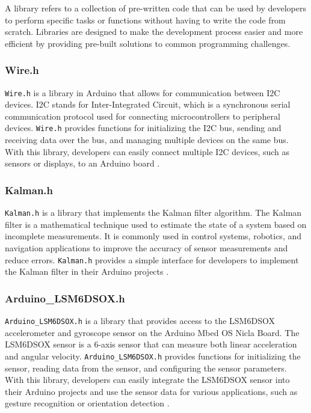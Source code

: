 A library refers to a collection of pre-written code that can be used by developers to perform specific tasks or functions without having to write the code from scratch. Libraries are designed to make the development process easier and more efficient by providing pre-built solutions to common programming challenges.

\subsubsection{Wire.h}
\texttt{Wire.h} is a library in Arduino that allows for communication between I2C devices. I2C stands for Inter-Integrated Circuit, which is a synchronous serial communication protocol used for connecting microcontrollers to peripheral devices. \texttt{Wire.h} provides functions for initializing the I2C bus, sending and receiving data over the bus, and managing multiple devices on the same bus. With this library, developers can easily connect multiple I2C devices, such as sensors or displays, to an Arduino board \cite{Ardc; Ari21}.

\subsubsection{Kalman.h}
\texttt{Kalman.h} is a library that implements the Kalman filter algorithm. The Kalman filter is a mathematical technique used to estimate the state of a system based on incomplete measurements. It is commonly used in control systems, robotics, and navigation applications to improve the accuracy of sensor measurements and reduce errors. \texttt{Kalman.h} provides a simple interface for developers to implement the Kalman filter in their Arduino projects \cite{Ard19; Fet21}.

\subsubsection{Arduino\_LSM6DSOX.h}
\texttt{Arduino\_LSM6DSOX.h} is a library that provides access to the LSM6DSOX accelerometer and gyroscope sensor on the Arduino Mbed OS Nicla Board. The LSM6DSOX sensor is a 6-axis sensor that can measure both linear acceleration and angular velocity. \texttt{Arduino\_LSM6DSOX.h} provides functions for initializing the sensor, reading data from the sensor, and configuring the sensor parameters. With this library, developers can easily integrate the LSM6DSOX sensor into their Arduino projects and use the sensor data for various applications, such as gesture recognition or orientation detection \cite{Lib21}.

